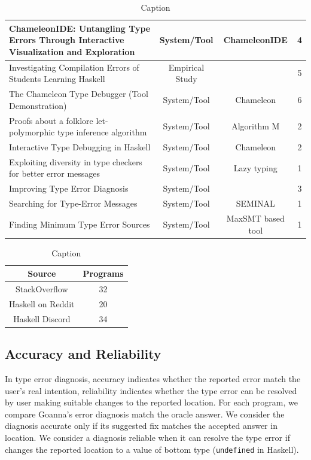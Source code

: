 \documentclass[pdflatex,sn-mathphys-num]{sn-jnl}%
\begin{document}
\begin{table}
\begin{tabular}{|p{5cm}|c|c|c|}
         \raggedright ChameleonIDE: Untangling Type Errors Through Interactive Visualization and Exploration & System/Tool & ChameleonIDE & 4 \\ \hline
         \raggedright Investigating Compilation Errors of Students Learning Haskell & Empirical Study &  & 5 \\ \hline
         \raggedright The Chameleon Type Debugger (Tool Demonstration) & System/Tool & Chameleon & 6 \\ \hline
         \raggedright Proofs about a folklore let-polymorphic type inference algorithm & System/Tool & Algorithm M & 2 \\ \hline
         \raggedright Interactive Type Debugging in Haskell & System/Tool & Chameleon & 2 \\ \hline
         \raggedright Exploiting diversity in type checkers for better error messages & System/Tool & Lazy typing & 1 \\ \hline
         \raggedright Improving Type Error Diagnosis & System/Tool &  & 3 \\ \hline
         \raggedright Searching for Type-Error Messages & System/Tool & SEMINAL &  1\\ \hline
         \raggedright Finding Minimum Type Error Sources & System/Tool & MaxSMT based tool & 1 \\ \hline
    \end{tabular}
    \caption{Caption}
    \label{tab:haskell-research}
\end{table}

\begin{table}
    \centering
    \begin{tabular}{|c|c|} \hline 
         \textbf{Source} & \textbf{Programs} \\ \hline 
         StackOverflow &  32 \\ \hline 
         Haskell on Reddit & 20 \\ \hline 
         Haskell Discord & 34 \\ \hline 
    \end{tabular}
    \caption{Caption}
    \label{tab:haskell-community}
\end{table}
 	\subsection{Accuracy and Reliability}\label{sub:eval-accuracy}

	In type error diagnosis, accuracy indicates whether the reported error match the user's real intention, reliability indicates whether the type error can be resolved by user making suitable changes to the reported location. For each program, we compare Goanna's error diagnosis match the oracle answer. We consider the diagnosis accurate only if its suggested fix matches the accepted answer in location. We consider a diagnosis reliable when it can resolve the type error if changes the reported location to a value of bottom type ({\tt undefined} in Haskell).
  
\end{document}
